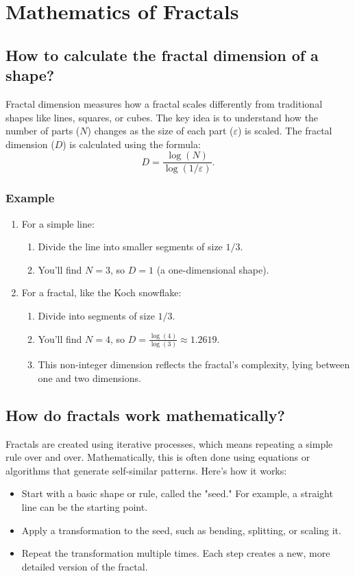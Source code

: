 \documentclass[12pt]{article}
\begin{document}
\section{Mathematics of Fractals}

\subsection{How to calculate the fractal dimension of a shape?}
Fractal dimension measures how a fractal scales differently from traditional shapes like lines, squares, or cubes. The key idea is to understand how the number of parts (\(N\)) changes as the size of each part (\(\varepsilon\)) is scaled. The fractal dimension (\(D\)) is calculated using the formula:
\[
D = \frac{\log(N)}{\log(1/\varepsilon)}.
\]

\subsubsection{Example}
\begin{enumerate}
    \item For a simple line:
	\begin{enumerate}
		\item Divide the line into smaller segments of size \(1/3\).
		\item You’ll find \(N = 3\), so \(D = 1\) (a one-dimensional shape).
\end{enumerate}
    \item For a fractal, like the Koch snowflake:
	\begin{enumerate}
		\item Divide into segments of size \(1/3\).
		\item You’ll find \(N = 4\), so \(D = \frac{\log(4)}{\log(3)} \approx 1.2619\).
		\item This non-integer dimension reflects the fractal's complexity, lying between one and two dimensions.
	\end{enumerate}
\end{enumerate}


\subsection{How do fractals work mathematically?}
Fractals are created using iterative processes, which means repeating a simple rule over and over. Mathematically, this is often done using equations or algorithms that generate self-similar patterns. Here’s how it works:
\begin{itemize}
    \item Start with a basic shape or rule, called the "seed." For example, a straight line can be the starting point.
    \item Apply a transformation to the seed, such as bending, splitting, or scaling it.
    \item Repeat the transformation multiple times. Each step creates a new, more detailed version of the fractal.
\end{itemize}
\end{document}
